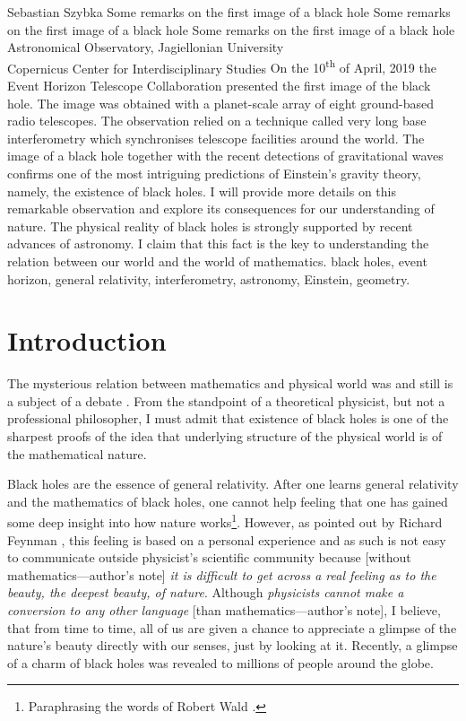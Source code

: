 \begin{artengenv}{Sebastian Szybka}
	{Some remarks on the first image of a black hole}
	{Some remarks on the first image of a black hole}
	{Some remarks on the first image of a black hole}
	{Astronomical Observatory, Jagiellonian University\\
	Copernicus Center for Interdisciplinary Studies}
	{On the 10\textsuperscript{th} of April, 2019 the Event Horizon Telescope Collaboration presented the first image of the black hole. The image was obtained with a planet-scale array of eight ground-based radio telescopes. The observation relied on a technique called very long base interferometry which synchronises telescope facilities around the world. The image of a black hole together with the recent detections of gravitational waves confirms one of the most intriguing predictions of Einstein's gravity theory, namely, the existence of black holes. I will provide more details on this remarkable observation and explore its consequences for our understanding of nature. The physical reality of black holes is strongly supported by recent advances of astronomy. I claim that this fact is the key to understanding the relation between our world and the world of mathematics.}
	{black holes, event horizon, general relativity, interferometry, astronomy, Einstein, geometry.}


\section{Introduction}

The mysterious relation between mathematics and physical world was and still is a subject of a debate \parencite{wigner_unreasonable_1960}. From the standpoint of a theoretical physicist, but not a professional philosopher, I must admit that existence of black holes is one of the sharpest proofs of the idea that underlying structure of the physical world is of the mathematical nature. 

Black holes are the essence of general relativity. After one learns general relativity and the mathematics of black holes, one cannot help feeling that one has gained some deep insight into how nature works\footnote{Paraphrasing the words of Robert Wald \parencite*{wald_general_1984}.}.  However, as pointed out by Richard Feynman \parencite*{feynman_character_1967}, this feeling is based on a personal experience and as such is not easy to communicate outside physicist's scientific community because  [without mathematics---author's note] \textit{it is difficult to get across a real feeling as to the beauty, the deepest beauty, of nature}. Although \textit{physicists cannot make a conversion to any other language} [than mathematics---author's note], I believe, that from time to time, all of us are given a chance to appreciate a glimpse of the nature's beauty directly with our senses, just by looking at it. Recently, a glimpse of a charm of black holes was revealed to millions of people around the globe.


\end{artengenv}
